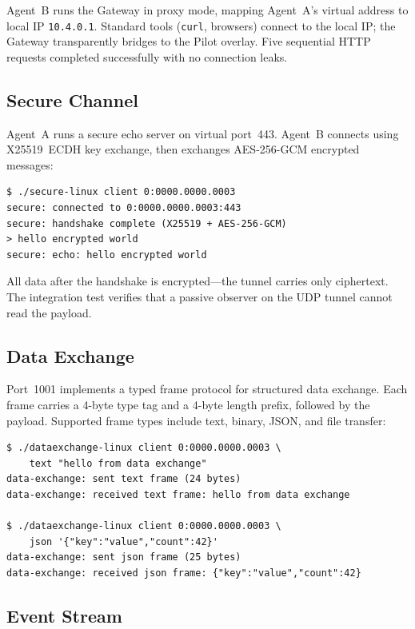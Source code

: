 \documentclass[11pt,a4paper]{article}
\begin{document}
Agent~B runs the Gateway in proxy mode, mapping Agent~A's virtual address to local IP \texttt{10.4.0.1}. Standard tools (\texttt{curl}, browsers) connect to the local IP; the Gateway transparently bridges to the Pilot overlay. Five sequential HTTP requests completed successfully with no connection leaks.

\subsection{Secure Channel}

Agent~A runs a secure echo server on virtual port~443. Agent~B connects using X25519~ECDH key exchange, then exchanges AES-256-GCM encrypted messages:

\begin{lstlisting}[basicstyle=\ttfamily\small]
$ ./secure-linux client 0:0000.0000.0003
secure: connected to 0:0000.0000.0003:443
secure: handshake complete (X25519 + AES-256-GCM)
> hello encrypted world
secure: echo: hello encrypted world
\end{lstlisting}

All data after the handshake is encrypted---the tunnel carries only ciphertext. The integration test verifies that a passive observer on the UDP tunnel cannot read the payload.

\subsection{Data Exchange}

Port~1001 implements a typed frame protocol for structured data exchange. Each frame carries a 4-byte type tag and a 4-byte length prefix, followed by the payload. Supported frame types include text, binary, JSON, and file transfer:

\begin{lstlisting}[basicstyle=\ttfamily\small]
$ ./dataexchange-linux client 0:0000.0000.0003 \
    text "hello from data exchange"
data-exchange: sent text frame (24 bytes)
data-exchange: received text frame: hello from data exchange

$ ./dataexchange-linux client 0:0000.0000.0003 \
    json '{"key":"value","count":42}'
data-exchange: sent json frame (25 bytes)
data-exchange: received json frame: {"key":"value","count":42}
\end{lstlisting}

\subsection{Event Stream}
\end{document}
